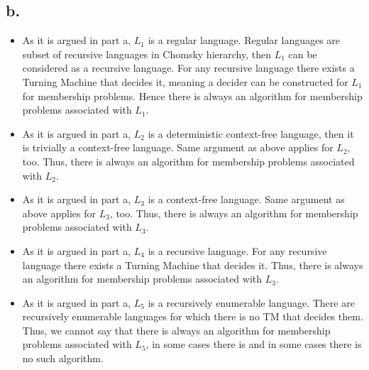 \documentclass[12pt]{article}
\begin{document}
\subsection*{b.}
\begin{itemize}
\item As it is argued in part a, $L_1$ is a regular language. Regular languages are subset of recursive languages in Chomsky hierarchy, then $L_1$ can be considered as a recursive language. For any recursive language there exists a Turning Machine that decides it, meaning a decider can be constructed for $L_1$ for membership problems. Hence there is always an algorithm for membership problems associated with $L_1$.
\item As it is argued in part a, $L_2$ is a deterministic context-free language, then it is trivially a context-free language. Same argument as above applies for $L_2$, too. Thus, there is always an algorithm for membership problems associated with $L_2$.
\item As it is argued in part a, $L_3$ is a context-free language. Same argument as above applies for $L_3$, too. Thus, there is always an algorithm for membership problems associated with $L_3$.
\item As it is argued in part a, $L_4$ is a recursive language. For any recursive language there exists a Turning Machine that decides it. Thus, there is always an algorithm for membership problems associated with $L_3$.
\item As it is argued in part a, $L_5$ is a recursively enumerable language. There are recursively enumerable languages for which there is no TM that decides them. Thus, we cannot say that there is always an algorithm for membership problems associated with $L_5$, in some cases there is and in some cases there is no such algorithm. 
\end{itemize}
\end{document}
